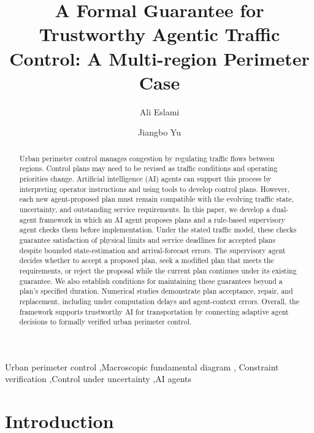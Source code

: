 \documentclass[final]{cas-sc}
\theoremstyle{definition}
\theoremstyle{plain}
\theoremstyle{definition}
\theoremstyle{plain}
\begin{document}
\title[mode=title]{A Formal Guarantee for Trustworthy Agentic Traffic Control: A Multi-region Perimeter Case}
\author[mcgill]{Ali Eslami}
\author[mcgill]{Jiangbo Yu}
\cormark[1]
\begin{abstract}
Urban perimeter control manages congestion by regulating traffic flows
between regions. Control plans may need to be revised as traffic conditions
and operating priorities change. Artificial intelligence (AI) agents can
support this process by interpreting operator instructions and using tools
to develop control plans. However, each new agent-proposed plan must remain
compatible with the evolving traffic state, uncertainty, and outstanding
service requirements. In this paper, we develop a dual-agent framework in
which an AI agent proposes plans and a rule-based supervisory agent checks
them before implementation. Under the stated traffic model, these checks
guarantee satisfaction of physical limits and service deadlines for accepted
plans despite bounded state-estimation and arrival-forecast errors. The
supervisory agent decides whether to accept a proposed plan, seek a modified
plan that meets the requirements, or reject the proposal while the current
plan continues under its existing guarantee. We also establish conditions
for maintaining these guarantees beyond a plan's specified duration.
Numerical studies demonstrate plan acceptance, repair, and replacement,
including under computation delays and agent-context errors. Overall, the
framework supports trustworthy AI for transportation by connecting adaptive
agent decisions to formally verified urban perimeter control.
\end{abstract}
\begin{keywords}
Urban perimeter control \sep Macroscopic fundamental diagram \sep
Constraint verification \sep Control under uncertainty \sep AI agents
\end{keywords}
\maketitle


\section{Introduction}
\label{sec:new-introduction}
\end{document}
